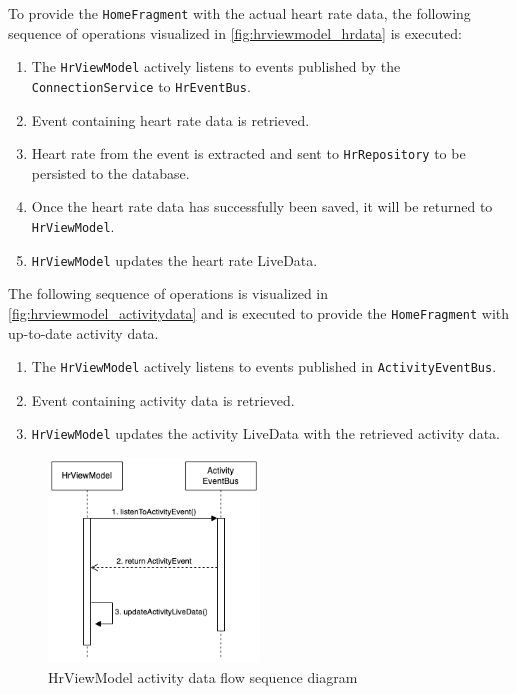 To provide the \texttt{HomeFragment} with the actual heart rate data, the following sequence of operations visualized in \autoref{fig:hrviewmodel_hrdata} is executed:
\begin{enumerate}
    \item The \texttt{HrViewModel} actively listens to events published by the \texttt{ConnectionService} to \texttt{HrEventBus}.
    \item Event containing heart rate data is retrieved.
    \item Heart rate from the event is extracted and sent to \texttt{HrRepository} to be persisted to the database.
    \item Once the heart rate data has successfully been saved, it will be returned to \texttt{HrViewModel}.
    \item \texttt{HrViewModel} updates the heart rate LiveData.
\end{enumerate}

The following sequence of operations is visualized in \autoref{fig:hrviewmodel_activitydata} and is executed to provide the \texttt{HomeFragment} with up-to-date activity data.
\begin{enumerate}
    \item The \texttt{HrViewModel} actively listens to events published in \texttt{ActivityEventBus}.
    \item Event containing activity data is retrieved.
    \item \texttt{HrViewModel} updates the activity LiveData with the retrieved activity data.
\end{enumerate}

\begin{figure}[H]
    \centering
    \includegraphics[width=0.5\textwidth]{diagrams/hrviewmodel-activity.drawio.png}
    \caption{HrViewModel activity data flow sequence diagram}
    \label{fig:hrviewmodel_activitydata}
\end{figure}

